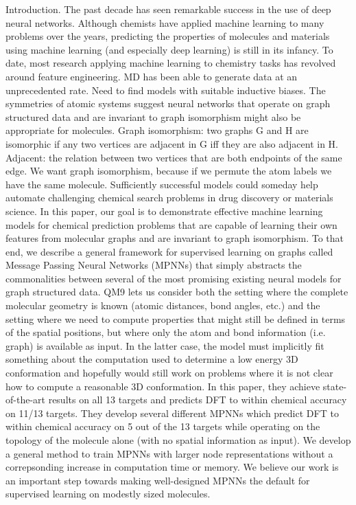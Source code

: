 \documentclass[12pt,reqno]{amsart}
\numberwithin{equation}{section}
\begin{document}
\begin{enumerate}
\subitem Introduction. The past decade has seen remarkable success in the use of deep neural networks.  Although chemists have applied machine learning to many problems over the years, predicting the properties of molecules and materials using machine learning (and especially deep learning) is still in its infancy.  To date, most research applying machine learning to chemistry tasks has revolved around feature engineering.  MD has been able to generate data at an unprecedented rate.  Need to find models with suitable inductive biases.  The symmetries of atomic systems suggest neural networks that operate on graph structured data and are invariant to graph isomorphism might also be appropriate for molecules.  Graph isomorphism: two graphs G and H are isomorphic if any two vertices are adjacent in G iff they are also adjacent in H.  Adjacent: the relation between two vertices that are both endpoints of the same edge.  We want graph isomorphism, because if we permute the atom labels we have the same molecule. Sufficiently successful models could someday help automate challenging chemical search problems in drug discovery or materials science.  In this paper, our goal is to demonstrate effective machine learning models for chemical prediction problems that are capable of learning their own features from molecular graphs and are invariant to graph isomorphism.  To that end, we describe a general framework for supervised learning on graphs called Message Passing Neural Networks (MPNNs) that simply abstracts the commonalities between several of the most promising existing neural models for graph structured data.  QM9 lets us consider both the setting where the complete molecular geometry is known (atomic distances, bond angles, etc.) and the setting where we need to compute properties that might still be defined in terms of the spatial positions, but where only the atom and bond information (i.e. graph) is available as input.  In the latter case, the model must implicitly fit something about the computation used to determine a low energy 3D conformation and hopefully would still work on problems where it is not clear how to compute a reasonable 3D conformation.  In this paper, they achieve state-of-the-art results on all 13 targets and predicts DFT to within chemical accuracy on 11/13 targets.  They develop several different MPNNs which predict DFT to within chemical accuracy on 5 out of the 13 targets while operating on the topology of the molecule alone (with no spatial information as input).  We develop a general method to train MPNNs with larger node representations without a correpsonding increase in computation time or memory.  We believe our work is an important step towards making well-designed MPNNs the default for supervised learning on modestly sized molecules.  

\end{enumerate}
\end{document}

